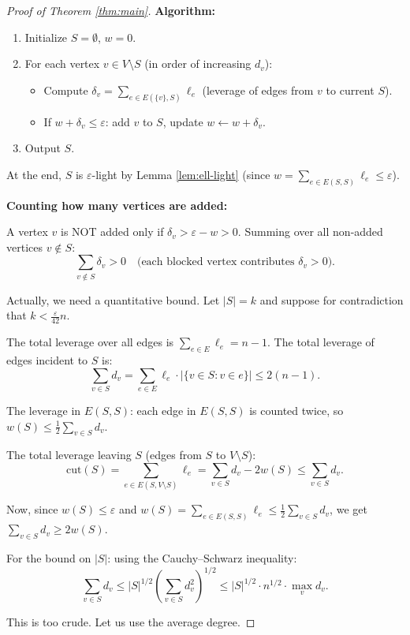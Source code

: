 \documentclass[12pt]{article}
\begin{document}
\begin{proof}[Proof of Theorem \ref{thm:main}]
\textbf{Algorithm:}
\begin{enumerate}
\item Initialize $S = \emptyset$, $w = 0$.
\item For each vertex $v \in V \setminus S$ (in order of increasing $d_v$):
   \begin{itemize}
   \item Compute $\delta_v = \sum_{e \in E(\{v\},S)} \ell_e$ (leverage of edges from $v$ to current $S$).
   \item If $w + \delta_v \leq \varepsilon$: add $v$ to $S$, update $w \leftarrow w + \delta_v$.
   \end{itemize}
\item Output $S$.
\end{enumerate}

At the end, $S$ is $\varepsilon$-light by Lemma \ref{lem:ell-light} (since $w = \sum_{e \in E(S,S)} \ell_e \leq \varepsilon$).

\textbf{Counting how many vertices are added:}

A vertex $v$ is NOT added only if $\delta_v > \varepsilon - w > 0$. Summing over all non-added vertices $v \notin S$:
\[
\sum_{v \notin S} \delta_v > 0 \quad \text{(each blocked vertex contributes } \delta_v > 0).
\]

Actually, we need a quantitative bound. Let $|S| = k$ and suppose for contradiction that $k < \frac{\varepsilon}{42} n$.

The total leverage over all edges is $\sum_{e \in E} \ell_e = n - 1$. The total leverage of edges incident to $S$ is:
\[
\sum_{v \in S} d_v = \sum_{e \in E} \ell_e \cdot |\{v \in S : v \in e\}| \leq 2(n-1).
\]

The leverage in $E(S,S)$: each edge in $E(S,S)$ is counted twice, so $w(S) \leq \frac{1}{2}\sum_{v \in S} d_v$.

The total leverage leaving $S$ (edges from $S$ to $V \setminus S$):
\[
\mathrm{cut}(S) = \sum_{e \in E(S, V\setminus S)} \ell_e = \sum_{v \in S} d_v - 2w(S) \leq \sum_{v \in S} d_v.
\]

Now, since $w(S) \leq \varepsilon$ and $w(S) = \sum_{e \in E(S,S)} \ell_e \leq \frac{1}{2}\sum_{v \in S} d_v$, we get $\sum_{v \in S} d_v \geq 2w(S)$.

For the bound on $|S|$: using the Cauchy--Schwarz inequality:
\[
\sum_{v \in S} d_v \leq |S|^{1/2} \left(\sum_{v \in S} d_v^2\right)^{1/2} \leq |S|^{1/2} \cdot n^{1/2} \cdot \max_v d_v.
\]

This is too crude. Let us use the average degree.


\end{proof}
\end{document}
